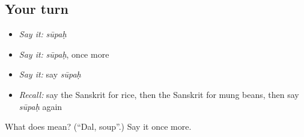 \subsection*{Your turn}
\begin{itemize}
\raggedright
  \item \emph{Say it:} \emph{sūpaḥ}
  \item \emph{Say it:} \emph{sūpaḥ}, once more
  \item \emph{Say it:} say \emph{sūpaḥ}
  \item \emph{Recall:} say the Sanskrit for rice, then the Sanskrit for mung beans, then say \emph{sūpaḥ} again
\end{itemize}

\begin{tcolorbox}[breakable,colback=teal!4,colframe=teal!35!black,title={Before you move on}]
What does  mean? (\textquotedblleft{}Dal, soup\textquotedblright{}.) Say it once more.
\end{tcolorbox}
